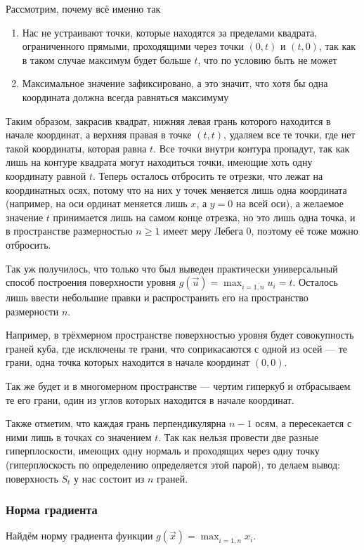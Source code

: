 Рассмотрим, почему всё именно так
\begin{enumerate}
  \item Нас не устраивают точки, которые находятся за пределами
      квадрата, ограниченного прямыми, проходящими через точки
      $\left( 0, t \right)$ и $\left( t, 0 \right)$,
      так как в таком случае максимум будет больше $t$,
      что по условию быть не может
  \item Максимальное значение зафиксировано, а это значит,
      что хотя бы одна координата должна
      всегда равняться максимуму
\end{enumerate}

Таким образом, закрасив квадрат, нижняя левая грань которого
находится в начале координат, а верхняя правая в точке $\left( t, t \right)$,
удаляем все те точки, где нет такой координаты, которая равна $t$.
Все точки внутри контура пропадут, так как лишь на контуре квадрата
могут находиться точки, имеющие хоть одну координату равной $t$.
Теперь осталось отбросить те отрезки, что лежат на координатных осях,
потому что на них у точек меняется лишь одна координата
(например, на оси ординат меняется лишь $x$, а $y=0$ на всей оси),
а желаемое значение $t$ принимается лишь на самом конце отрезка,
но это лишь одна точка, и в пространстве размерностью $n \ge 1$
имеет меру Лебега $0$, поэтому её тоже можно отбросить.

Так уж получилось, что только что был выведен
практически универсальный способ построения поверхности уровня
$g\left( \vec{u} \right) = \max_{i= \overline{1,n}} u_i = t$.
Осталось лишь ввести небольшие правки и распространить его на
пространство размерности $n$.

Например, в трёхмерном пространстве поверхностью уровня будет
совокупность граней куба, где исключены те грани,
что соприкасаются с одной из осей --- те грани, одна точка которых
находится в начале координат $\left( 0, 0 \right)$.

Так же будет и в многомерном пространстве --- чертим гиперкуб
и отбрасываем те его грани, один из углов которых находится в начале координат.

Также отметим, что каждая грань перпендикулярна $n-1$ осям,
а пересекается с ними лишь в точках со значением $t$.
Так как нельзя провести две разные гиперплоскости, имеющих одну нормаль
и проходящих через одну точку (гиперплоскость по определению
определяется этой парой), то делаем вывод:
поверхность $S_t$ у нас состоит из $n$ граней.

\subsubsection{Норма градиента}
Найдём норму градиента функции
$g\left( \vec{x} \right) = \max_{i= \overline{1,n}} x_i$.

